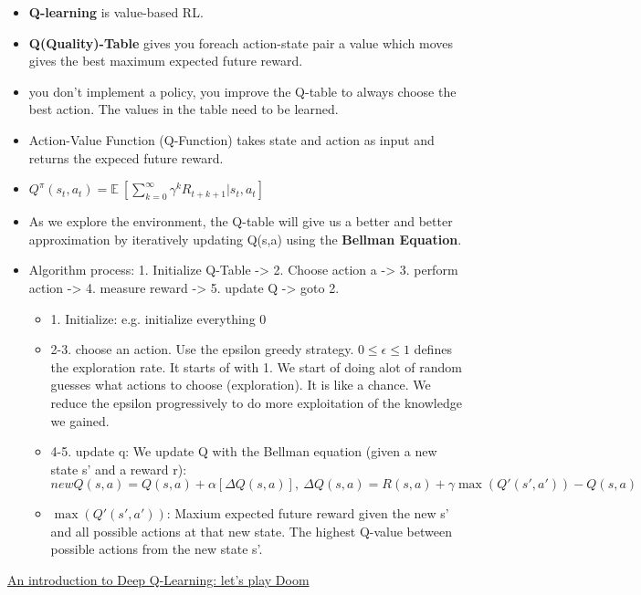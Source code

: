 \begin{itemize}[noitemsep,nolistsep]
	\item \textbf{Q-learning} is value-based RL.
	\item \textbf{Q(Quality)-Table} gives you foreach action-state pair a value which moves gives the best maximum expected future reward.
	\item you don't implement a policy, you improve the Q-table to always choose the best action. The values in the table need to be learned.
	\item Action-Value Function (Q-Function) takes state and action as input and returns the expeced future reward.
	\item $Q^\pi(s_t,a_t) = \mathbb{E}\ [\sum_{k=0}^\infty \gamma^k R_{t+k+1} | s_t, a_t]$
	\item As we explore the environment, the Q-table will give us a better and better approximation by iteratively updating Q(s,a) using the \textbf{Bellman Equation}.
	\item Algorithm process: 1. Initialize Q-Table -> 2. Choose action a -> 3. perform action -> 4. measure reward -> 5. update Q -> goto 2.
	\begin{itemize}[noitemsep,nolistsep]
		\item 1. Initialize: e.g. initialize everything 0
		\item 2-3. choose an action. Use the epsilon greedy strategy. $ 0 \leq \epsilon \leq 1$ defines the exploration rate. It starts of with 1. We start of doing alot of random guesses what actions to choose (exploration). It is like a chance. We reduce the epsilon progressively to do more exploitation of the knowledge we gained.
		\item 4-5. update q: We update Q with the Bellman equation (given a new state s' and a reward r): $newQ(s,a) = Q(s,a) + \alpha[\Delta Q(s,a)],\ \Delta Q(s,a) = R(s,a) + \gamma \max(Q'(s',a')) - Q(s,a)$
		\item $\max(Q'(s',a'))$: Maxium expected future reward given the new s' and all possible actions at that new state. The highest Q-value between possible actions from the new state s'.
	\end{itemize} 
\end{itemize} 
\href{https://www.freecodecamp.org/news/an-introduction-to-deep-q-learning-lets-play-doom-54d02d8017d8/}{An introduction to Deep Q-Learning: let’s play Doom}
